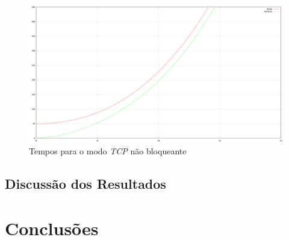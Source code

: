 \documentclass[12pt]{article}
\begin{document}
\begin{figure}[ht]
  \centering
  \includegraphics[width=1\textwidth]{img/tcp-graph.png}
  \caption{Tempos para o modo \emph{TCP} não bloqueante}
  \label{fig:tcp-graph}
\end{figure}

\subsection{Discussão dos Resultados} \label{sub:discussao}
\section{Conclusões} \label{sec:conclusoes}





\end{document}
